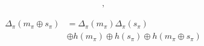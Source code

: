 \documentclass[twocolumn, aps, amsmath, amssymb, nofootinbib, superscriptaddress, longbibliography, doublefloatfix, table-of-contents, eqsecnum, rmp]{revtex4-2}
\begin{document}

\begin{align}
	[m_\pi \oplus s_\pi, \Delta_\pi(m_\pi\oplus s_\pi)],
\end{align}

\begin{align}
	\Delta_\pi(m_\pi\oplus s_\pi) &= \Delta_\pi(m_\pi) \Delta_\pi(s_\pi) \nonumber\\
	&\oplus h(m_\pi) \oplus h(s_\pi) \oplus h(m_\pi \oplus s_\pi)
\end{align}

\end{document}
